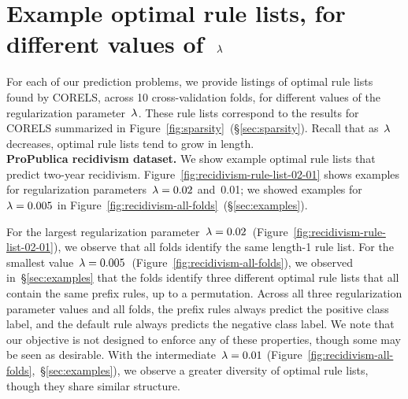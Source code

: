 \section{Example optimal rule lists, for different values of~${\lambda}$}
\label{appendix:examples}

For each of our prediction problems, we provide listings of
optimal rule lists found by CORELS, across 10 cross-validation folds,
for different values of the regularization parameter~${\lambda}$.
%
These rule lists correspond to the results for CORELS summarized
in Figure~\ref{fig:sparsity}~(\S\ref{sec:sparsity}).
%
Recall that as~${\lambda}$ decreases, optimal rule lists tend to grow in length. \\

\textbf{ProPublica recidivism dataset.}
We show example optimal rule lists that predict two-year recidivism.
%
Figure~\ref{fig:recidivism-rule-list-02-01} shows examples for
regularization parameters~${{\lambda} = 0.02}$ and~0.01;
we showed examples for~${{\lambda} = 0.005}$ in
Figure~\ref{fig:recidivism-all-folds}~(\S\ref{sec:examples}).

For the largest regularization parameter~${{\lambda} = 0.02}$~(Figure~\ref{fig:recidivism-rule-list-02-01}),
we observe that all folds identify the same length-1 rule list.
%
For the smallest value~${{\lambda} = 0.005}$~(Figure~\ref{fig:recidivism-all-folds}),
we observed in~\S\ref{sec:examples} that the folds identify three different
optimal rule lists that all contain the same prefix rules, up to a permutation.
%
Across all three regularization parameter values and all folds,
the prefix rules always predict the positive class label,
and the default rule always predicts the negative class label.
%
We note that our objective is not designed to enforce any of these properties,
though some may be seen as desirable.
%
With the intermediate~${{\lambda} = 0.01}$ (Figure~\ref{fig:recidivism-all-folds},~\S\ref{sec:examples}),
we observe a greater diversity of optimal rule lists, though they share similar structure.

